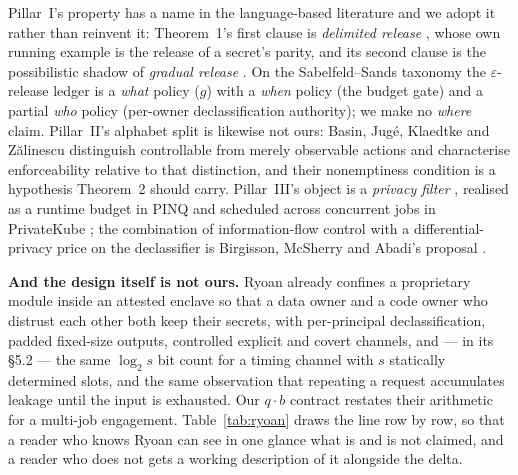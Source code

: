 \documentclass[11pt,a4paper]{article}
\begin{document}
Pillar~I's property has a name in the language-based literature and we adopt it rather than reinvent it: Theorem~1's first
clause is \emph{delimited release} \cite{sm03}, whose own running example is the release of a secret's parity, and its second
clause is the possibilistic shadow of \emph{gradual release} \cite{as07}. On the Sabelfeld--Sands taxonomy \cite{ss09} the
$\varepsilon$-release ledger is a \emph{what} policy ($g$) with a \emph{when} policy (the budget gate) and a partial \emph{who}
policy (per-owner declassification authority); we make no \emph{where} claim. Pillar~II's alphabet split is likewise not ours:
Basin, Jug\'e, Klaedtke and Z\u{a}linescu \cite{bjkz13} distinguish controllable from merely observable actions and characterise
enforceability relative to that distinction, and their nonemptiness condition is a hypothesis Theorem~2 should carry. Pillar~III's
object is a \emph{privacy filter} \cite{rruv16}, realised as a runtime budget in PINQ \cite{pinq09} and scheduled across
concurrent jobs in PrivateKube \cite{pkube21}; the combination of information-flow control with a differential-privacy price on
the declassifier is Birgisson, McSherry and Abadi's proposal \cite{bma11}.

\textbf{And the design itself is not ours.} Ryoan \cite{ryoan16} already confines a proprietary module inside an attested enclave
so that a data owner and a code owner who distrust each other both keep their secrets, with per-principal declassification, padded
fixed-size outputs, controlled explicit and covert channels, and --- in its \S5.2 --- the same $\log_2 s$ bit count for a
timing channel with $s$ statically determined slots, and the same observation that repeating a request accumulates leakage until
the input is exhausted. Our $q\cdot b$ contract restates their arithmetic for a multi-job engagement. Table~\ref{tab:ryoan} draws the
line row by row, so that a reader who knows Ryoan can see in one glance what is and is not claimed, and a reader who does not gets
a working description of it alongside the delta.
\end{document}
